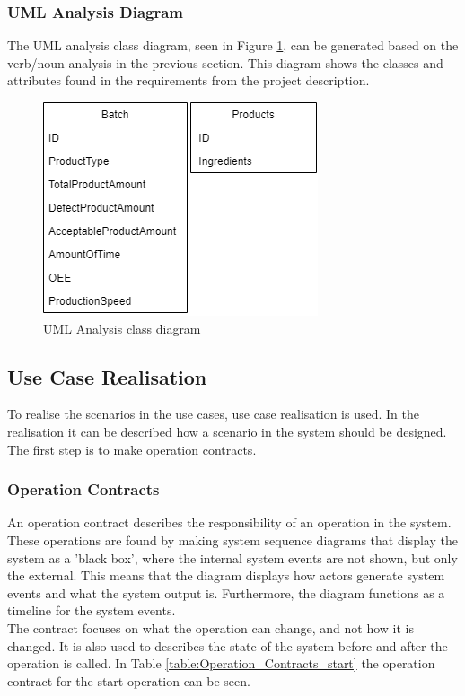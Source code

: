 \subsubsection{UML Analysis Diagram}
The UML analysis class diagram, seen in Figure \ref{figure:analysis_diagram},
can be generated based on the verb/noun analysis in the previous section. This
diagram shows the classes and attributes found in the requirements from the
project description.

\begin{figure}[ht]
	\centering 
	\includegraphics[scale=0.6]{images/diagrams/class_diagram.png}
	\caption{UML Analysis class diagram}
	\label{figure:analysis_diagram} 
\end{figure}

\subsection{Use Case Realisation}
To realise the scenarios in the use cases, use case realisation is used. In the
realisation it can be described how a scenario in the system should be designed.
The first step is to make operation contracts.

\subsubsection{Operation Contracts}
An operation contract describes the responsibility of an operation in the system.
These operations are found by making system sequence diagrams that display the
system as a 'black box', where the internal system events are not shown, but
only the external. This means that the diagram displays how actors generate
system events and what the system output is. Furthermore, the diagram functions
as a timeline for the system events. \\

The contract focuses on what the operation can change, and not how it is changed. 
It is also used to describes the state of the system before and after the 
operation is called. In Table \ref{table:Operation_Contracts_start} the
operation contract for the start operation can be seen.

